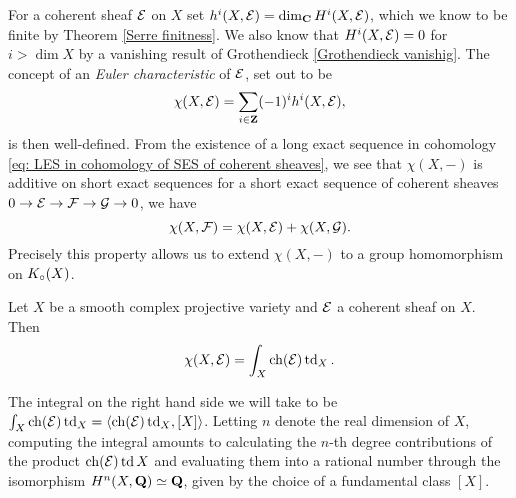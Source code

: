 For a coherent sheaf $\mathcal E$ on $X$ set $h^i(X, \mathcal E) = \dim_\mathbf C H^i(X, \mathcal E)$, which we know to be finite by Theorem \ref{Serre finitness}. We also know that $H^{i}(X, \mathcal E) = 0$ for $i > \dim X$ by a vanishing result of Grothendieck \ref{Grothendieck vanishig}.
The concept of an \emph{Euler characteristic} of $\mathcal E$, set out to be
\[
    \chi(X, \mathcal E) = \sum_{i \in \mathbf Z} (-1)^i h^i(X, \mathcal E),
\] 
is then well-defined. From the existence of a long exact sequence in cohomology \eqref{eq: LES in cohomology of SES of coherent sheaves}, we see that $\chi(X, -)$ is additive on short exact sequences \ie for a short exact sequence of coherent sheaves $0 \to \mathcal E \to \mathcal F \to \mathcal G \to 0$, we have
\[
    \chi(X, \mathcal F) = \chi(X, \mathcal E) + \chi(X, \mathcal G).
\]
Precisely this property allows us to extend $\chi(X,-)$ to a group homomorphism on $K_{\circ}(X)$.
\begin{theorem}
    \label{Hirzebruch-Riemann-Roch}
    Let $X$ be a smooth complex projective variety and $\mathcal E$ a coherent sheaf on $X$. Then
    \begin{equation}
        \label{eq: Hirzebruch-Riemann-Roch formula}
        \chi(X, \E) = \int_X \ch{\E}\tdclass{X}.
    \end{equation}
\end{theorem}


\begin{remark}
    The integral on the right hand side we will take to be $\int_X \ch{\E}\tdclass{X} = \pairing{\ch{\E}\tdclass{X}}{[X]}$. 
    Letting $n$ denote the real dimension of $X$, computing the integral amounts to calculating the $n$-th degree contributions of the product $\ch{\E}\td{X}$ and evaluating them into a rational number through the isomorphism $H^{n}(X, \mathbf Q) \simeq \mathbf Q$, given by the choice of a fundamental class $[X]$.
\end{remark}

